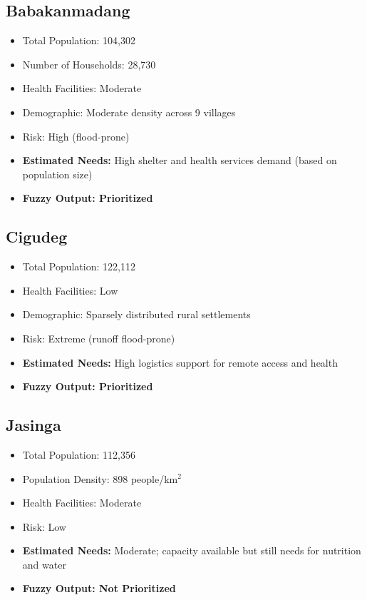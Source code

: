 \documentclass[journal,final,a4paper,twoside,11pt]{IEEEtran}
\begin{document}
\subsection*{Babakanmadang}
\begin{itemize}
    \item Total Population: 104,302
    \item Number of Households: 28,730
    \item Health Facilities: Moderate
    \item Demographic: Moderate density across 9 villages
    \item Risk: High (flood-prone)
    \item \textbf{Estimated Needs:} High shelter and health services demand (based on population size)
    \item \textbf{Fuzzy Output: Prioritized}
\end{itemize}

\subsection*{Cigudeg}
\begin{itemize}
    \item Total Population: 122,112
    \item Health Facilities: Low
    \item Demographic: Sparsely distributed rural settlements
    \item Risk: Extreme (runoff flood-prone)
    \item \textbf{Estimated Needs:} High logistics support for remote access and health
    \item \textbf{Fuzzy Output: Prioritized}
\end{itemize}

\subsection*{Jasinga}
\begin{itemize}
    \item Total Population: 112,356
    \item Population Density: 898 people/km$^2$
    \item Health Facilities: Moderate
    \item Risk: Low
    \item \textbf{Estimated Needs:} Moderate; capacity available but still needs for nutrition and water
    \item \textbf{Fuzzy Output: Not Prioritized}
\end{itemize}
\end{document}
